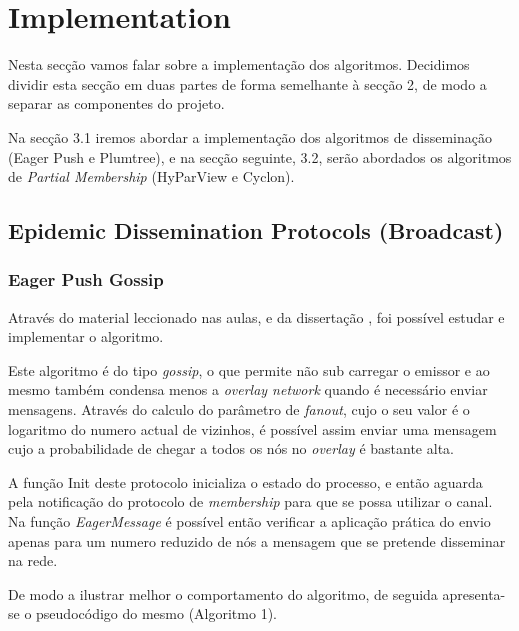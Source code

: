 \section{Implementation}


Nesta secção vamos falar sobre a implementação dos algoritmos. Decidimos dividir esta secção em duas partes de forma semelhante à secção 2, de modo a separar as componentes do projeto.

Na secção 3.1 iremos abordar a implementação dos algoritmos de disseminação (Eager Push e Plumtree), e na secção seguinte, 3.2, serão abordados os algoritmos de \textit{Partial Membership} (HyParView e Cyclon).

\subsection{Epidemic Dissemination Protocols (Broadcast)}

\subsubsection{Eager Push Gossip}
Através do material leccionado nas aulas, e da dissertação \cite{leitao}, foi possível estudar e implementar o algoritmo.

Este algoritmo é do tipo \textit{gossip}, o que permite não sub carregar o emissor e ao mesmo também condensa menos a \textit{overlay network }quando é necessário enviar mensagens. Através do calculo do parâmetro de \textit{fanout}, cujo o seu valor é o logaritmo do numero actual de vizinhos, é possível assim enviar uma mensagem cujo a probabilidade de chegar a todos os nós no \textit{overlay} é bastante alta. 

A função Init deste protocolo inicializa o estado do processo, e então aguarda pela notificação do protocolo de \textit{membership} para que se possa utilizar o canal. Na função \textit{EagerMessage} é possível então verificar a aplicação prática do envio apenas para um numero reduzido de nós a mensagem que se pretende disseminar na rede.

De modo a ilustrar melhor o comportamento do algoritmo, de seguida apresenta-se o pseudocódigo do mesmo (Algoritmo 1).

